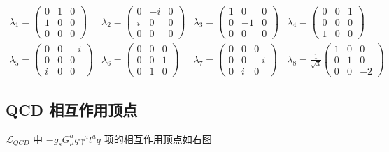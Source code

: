 \documentclass[oneside,a4paper,openany,11pt]{ctexbook}
\begin{document}
\begin{align}
    \lambda_1=\begin{pmatrix}
    0 & 1 & 0 \\
    1 & 0 & 0 \\
    0 & 0 & 0
    \end{pmatrix} & \lambda_2=\begin{pmatrix}
    0 & -i & 0 \\
    i & 0 & 0 \\
    0 & 0 & 0
    \end{pmatrix} & \lambda_3=\begin{pmatrix}
    1 & 0 & 0 \\
    0 & -1 & 0 \\
    0 & 0 & 0
    \end{pmatrix} & \lambda_4=\begin{pmatrix}
    0 & 0 & 1 \\
    0 & 0 & 0 \\
    1 & 0 & 0
    \end{pmatrix} \\
    \lambda_5=\begin{pmatrix}
    0 & 0 & -i \\
    0 & 0 & 0 \\
    i & 0 & 0
    \end{pmatrix} & \lambda_6=\begin{pmatrix}
    0 & 0 & 0 \\
    0 & 0 & 1 \\
    0 & 1 & 0
    \end{pmatrix} & \lambda_7=\begin{pmatrix}
    0 & 0 & 0 \\
    0 & 0 & -i \\
    0 & i & 0
    \end{pmatrix} & \lambda_8=
    \frac{1}{\sqrt{3}}\begin{pmatrix}
    1 & 0 & 0 \\
    0 & 1 & 0 \\
    0 & 0 & -2
    \end{pmatrix}
\end{align}

\subsection{QCD 相互作用顶点}

$\mathcal{L}_{QCD}$ 中 $-g_s G^a_\mu \overline{q} \gamma^\mu t^a q$ 项的相互作用顶点如右图
\end{document}
